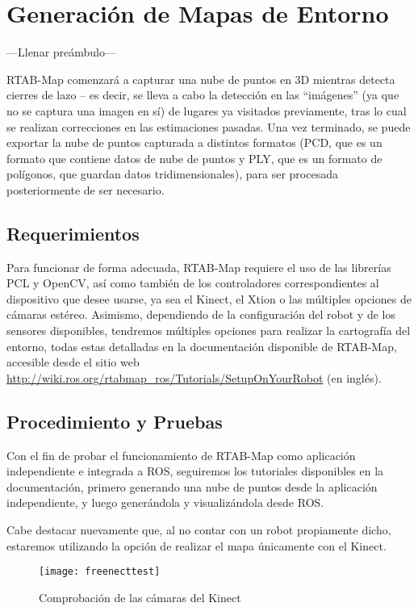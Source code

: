 \section{Generación de Mapas de Entorno}

---Llenar preámbulo---

RTAB-Map comenzará a capturar una nube de puntos en 3D mientras detecta cierres de lazo -- es decir, se lleva a cabo la detección en las ``imágenes'' (ya que no se captura una imagen en sí) de lugares ya visitados previamente, tras lo cual se realizan correcciones en las estimaciones pasadas. Una vez terminado, se puede exportar la nube de puntos capturada a distintos formatos (PCD, que es un formato que contiene datos de nube de puntos \cite{pcdformat} y PLY, que es un formato de polígonos, que guardan datos tridimensionales), para ser procesada posteriormente de ser necesario.

\subsection{Requerimientos}

Para funcionar de forma adecuada, RTAB-Map requiere el uso de las librerías PCL y OpenCV, así como también de los controladores correspondientes al dispositivo que desee usarse, ya sea el Kinect, el Xtion o las múltiples opciones de cámaras estéreo. Asimismo, dependiendo de la configuración del robot y de los sensores disponibles, tendremos múltiples opciones para realizar la cartografía del entorno, todas estas detalladas en la documentación disponible de RTAB-Map, accesible desde el sitio web \url{http://wiki.ros.org/rtabmap_ros/Tutorials/SetupOnYourRobot} (en inglés).

\subsection{Procedimiento y Pruebas}

Con el fin de probar el funcionamiento de RTAB-Map como aplicación independiente e integrada a ROS, seguiremos los tutoriales disponibles en la documentación, primero generando una nube de puntos desde la aplicación independiente, y luego generándola y visualizándola desde ROS.

Cabe destacar nuevamente que, al no contar con un robot propiamente dicho, estaremos utilizando la opción de realizar el mapa únicamente con el Kinect.

\begin{figure}[b]
\centering
\texttt{[image: freenecttest]}
\caption{Comprobación de las cámaras del Kinect}
\label{figure:freenecttest}
\end{figure}

